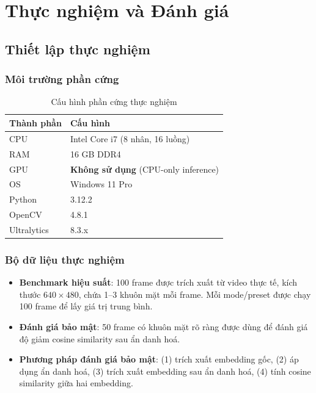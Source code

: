\section{Thực nghiệm và Đánh giá}
\label{sec:thucnghiem}

\subsection{Thiết lập thực nghiệm}
\label{subsec:setup}

\subsubsection{Môi trường phần cứng}

\begin{table}[H]
\centering
\caption{Cấu hình phần cứng thực nghiệm}
\label{tab:hardware}
\begin{tabular}{|l|p{9cm}|}
\hline
\textbf{Thành phần} & \textbf{Cấu hình} \\
\hline
CPU & Intel Core i7 (8 nhân, 16 luồng) \\
RAM & 16 GB DDR4 \\
GPU & \textbf{Không sử dụng} (CPU-only inference) \\
OS & Windows 11 Pro \\
Python & 3.12.2 \\
OpenCV & 4.8.1 \\
Ultralytics & 8.3.x \\
\hline
\end{tabular}
\end{table}

\subsubsection{Bộ dữ liệu thực nghiệm}

\begin{itemize}
    \item \textbf{Benchmark hiệu suất}: 100 frame được trích xuất từ video thực tế, kích thước $640 \times 480$, chứa 1--3 khuôn mặt mỗi frame. Mỗi mode/preset được chạy 100 frame để lấy giá trị trung bình.
    \item \textbf{Đánh giá bảo mật}: 50 frame có khuôn mặt rõ ràng được dùng để đánh giá độ giảm cosine similarity sau ẩn danh hoá.
    \item \textbf{Phương pháp đánh giá bảo mật}: (1) trích xuất embedding gốc, (2) áp dụng ẩn danh hoá, (3) trích xuất embedding sau ẩn danh hoá, (4) tính cosine similarity giữa hai embedding.
\end{itemize}

